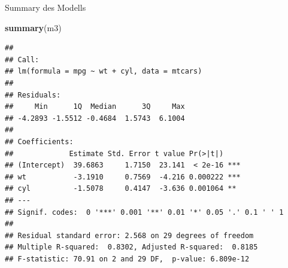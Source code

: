\documentclass[
  ignorenonframetext,
]{beamer}
\newenvironment{Shaded}{\begin{snugshade}}{\end{snugshade}}
\newcommand{\KeywordTok}[1]{\textcolor[rgb]{0.26,0.66,0.93}{\textbf{#1}}}
\newcommand{\NormalTok}[1]{\textcolor[rgb]{0.74,0.68,0.62}{#1}}
\begin{document}
\begin{frame}[fragile]{Summary des Modells}
\protect\hypertarget{summary-des-modells}{}

\begin{Shaded}
\begin{Highlighting}[]
\KeywordTok{summary}\NormalTok{(m3)}
\end{Highlighting}
\end{Shaded}

\begin{verbatim}
## 
## Call:
## lm(formula = mpg ~ wt + cyl, data = mtcars)
## 
## Residuals:
##     Min      1Q  Median      3Q     Max 
## -4.2893 -1.5512 -0.4684  1.5743  6.1004 
## 
## Coefficients:
##             Estimate Std. Error t value Pr(>|t|)    
## (Intercept)  39.6863     1.7150  23.141  < 2e-16 ***
## wt           -3.1910     0.7569  -4.216 0.000222 ***
## cyl          -1.5078     0.4147  -3.636 0.001064 ** 
## ---
## Signif. codes:  0 '***' 0.001 '**' 0.01 '*' 0.05 '.' 0.1 ' ' 1
## 
## Residual standard error: 2.568 on 29 degrees of freedom
## Multiple R-squared:  0.8302, Adjusted R-squared:  0.8185 
## F-statistic: 70.91 on 2 and 29 DF,  p-value: 6.809e-12
\end{verbatim}

\end{frame}
\end{document}
